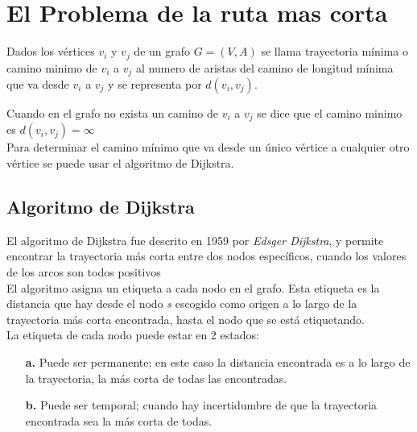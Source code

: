 
    \section{El Problema de la ruta mas corta} %
    \label{sec:ruta_mas_corta}
      Dados los vértices $v_{i}$ y $v_{j}$ de un grafo $G = (V,A)$ se llama trayectoria mínima o camino minimo  de \(v_i\) a \(v_j\) al numero de aristas del camino de longitud mínima que va desde $v_i$ a $v_j$ y se representa por $d(v_i, v_j)$.

      Cuando en el grafo no exista un camino de $v_i$ a $v_j$ se dice que el camino minimo es $d(v_i, v_j) = \infty$ \\

      Para determinar el camino mínimo que va desde un único vértice a cualquier otro vértice se puede usar el algoritmo de Dijkstra.



      \subsection{Algoritmo de Dijkstra} %
      \label{sub:algoritmo_de_dijkstra}
      El algoritmo de  Dijkstra fue descrito en 1959 por \emph{Edsger Dijkstra}, y permite encontrar la trayectoria más corta entre dos nodos específicos, cuando los valores de los arcos son todos positivos\\

      El algoritmo asigna un etiqueta a cada nodo en el grafo. Esta etiqueta es la distancia que hay desde el nodo \emph{s} escogido como origen a lo largo de la trayectoria más corta encontrada, hasta el nodo que se está etiquetando.\\

      La etiqueta de cada nodo puede estar en 2 estados:

      \begin{itemize}
        \item[\textbf{a.}] Puede ser permanente; en este caso la distancia encontrada es a lo largo de la trayectoria, la más corta de todas las encontradas.
        \item[\textbf{b.}] Puede ser temporal; cuando hay incertidumbre de que la trayectoria encontrada sea la más corta de todas.
      \end{itemize}

